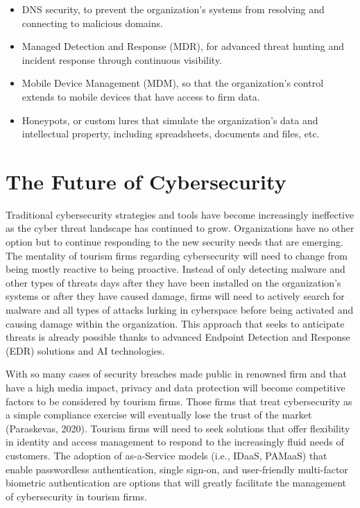 \documentclass[
  letterpaper,
  DIV=11,
  numbers=noendperiod]{scrreprt}
\begin{document}
\begin{itemize}
\item
  DNS security, to prevent the organization's systems from resolving and
  connecting to malicious domains.
\item
  Managed Detection and Response (MDR), for advanced threat hunting and
  incident response through continuous visibility.
\item
  Mobile Device Management (MDM), so that the organization's control
  extends to mobile devices that have access to firm data.
\item
  Honeypots, or custom lures that simulate the organization's data and
  intellectual property, including spreadsheets, documents and files,
  etc.
\end{itemize}

\hypertarget{the-future-of-cybersecurity}{%
\section{The Future of
Cybersecurity}\label{the-future-of-cybersecurity}}

Traditional cybersecurity strategies and tools have become increasingly
ineffective as the cyber threat landscape has continued to grow.
Organizations have no other option but to continue responding to the new
security needs that are emerging. The mentality of tourism firms
regarding cybersecurity will need to change from being mostly reactive
to being proactive. Instead of only detecting malware and other types of
threats days after they have been installed on the organization's
systems or after they have caused damage, firms will need to actively
search for malware and all types of attacks lurking in cyberspace before
being activated and causing damage within the organization. This
approach that seeks to anticipate threats is already possible thanks to
advanced Endpoint Detection and Response (EDR) solutions and AI
technologies.

With so many cases of security breaches made public in renowned firm and
that have a high media impact, privacy and data protection will become
competitive factors to be considered by tourism firms. Those firms that
treat cybersecurity as a simple compliance exercise will eventually lose
the trust of the market (Paraskevas, 2020). Tourism firms will need to
seek solutions that offer flexibility in identity and access management
to respond to the increasingly fluid needs of customers. The adoption of
as-a-Service models (i.e., IDaaS, PAMaaS) that enable passwordless
authentication, single sign-on, and user-friendly multi-factor biometric
authentication are options that will greatly facilitate the management
of cybersecurity in tourism firms.
\end{document}
